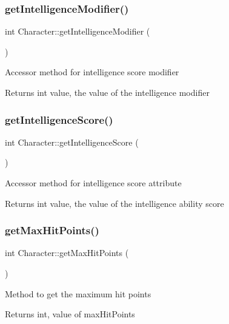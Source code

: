 \subsubsection{\texorpdfstring{get\+Intelligence\+Modifier()}{getIntelligenceModifier()}}
{\footnotesize\ttfamily int Character\+::get\+Intelligence\+Modifier (\begin{DoxyParamCaption}{ }\end{DoxyParamCaption})}

Accessor method for intelligence score modifier \begin{DoxyReturn}{Returns}
int value, the value of the intelligence modifier 
\end{DoxyReturn}
\hypertarget{class_character_a515aa3b9303281674dc82ad7d59e9337}{}\label{class_character_a515aa3b9303281674dc82ad7d59e9337} 
\subsubsection{\texorpdfstring{get\+Intelligence\+Score()}{getIntelligenceScore()}}
{\footnotesize\ttfamily int Character\+::get\+Intelligence\+Score (\begin{DoxyParamCaption}{ }\end{DoxyParamCaption})}

Accessor method for intelligence score attribute \begin{DoxyReturn}{Returns}
int value, the value of the intelligence ability score 
\end{DoxyReturn}
\hypertarget{class_character_a2c14caedf6a4a354589c14c7a2f53b0e}{}\label{class_character_a2c14caedf6a4a354589c14c7a2f53b0e} 
\subsubsection{\texorpdfstring{get\+Max\+Hit\+Points()}{getMaxHitPoints()}}
{\footnotesize\ttfamily int Character\+::get\+Max\+Hit\+Points (\begin{DoxyParamCaption}{ }\end{DoxyParamCaption})}

Method to get the maximum hit points \begin{DoxyReturn}{Returns}
int, value of max\+Hit\+Points 
\end{DoxyReturn}
\hypertarget{class_character_aa0193d35d813ff170e5e3fbdcf259b8c}{}\label{class_character_aa0193d35d813ff170e5e3fbdcf259b8c} 

